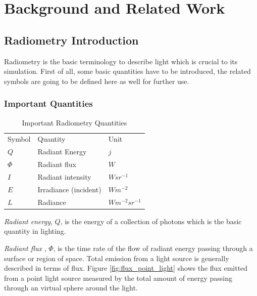 \chapter{Background and Related Work}


\section{Radiometry Introduction}
Radiometry is the basic terminology to describe light which is crucial to its simulation. First of all, some basic quantities have to be introduced, the related symbols are going to be defined here as well for further use.

\subsection{Important Quantities}

\begin{table}[ht]
\begin{center}
	
	\renewcommand{\arraystretch}{1.2}
	\begin{tabular}{ | l | l | l |}     	
	\hline

	Symbol & Quantity & Unit \\
	\cline{1-3}

	\(Q\) 			& 		Radiant Energy 				& 		\(j\) \\
	\(\Phi\) 			& 		Radiant flux 					& 		\(W\) \\
	\(I\) 			& 		Radiant intensity 				& 		\(W sr^{-1}\) \\
	\(E\)			&		Irradiance (incident) 			&		\(W m^{-2}\) \\
	\(L\)			&		Radiance						&		\(W m^{-2} sr^{-1}\) \\
	
	\hline

	\end{tabular}
\end{center}
\caption{Important Radiometry Quantities}
\label{tab:radiometry_quantities}
\end{table}

\emph{Radiant energy}, \(Q\), is the energy of a collection of photons which is the basic quantity in lighting.

\emph{Radiant flux} , \(\Phi\), is the time rate of the flow of radiant energy passing through a surface or region of space. Total emission from a light source is generally described in terms of flux. Figure \ref{fig:flux_point_light} shows the flux emitted from a point light source measured by the total amount of energy passing through an virtual sphere around the light.

